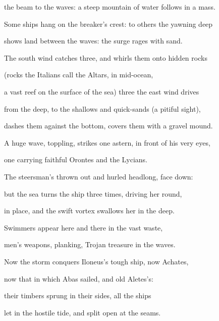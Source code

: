 \documentclass[12pt, a5paper, titlepage]{letter}
\begin{document}
the beam to the waves: a steep mountain of water follows in a mass.

Some ships hang on the breaker’s crest: to others the yawning deep

shows land between the waves: the surge rages with sand.

The south wind catches three, and whirls them onto hidden rocks

(rocks the Italians call the Altars, in mid-ocean,

a vast reef on the surface of the sea) three the east wind drives

from the deep, to the shallows and quick-sands (a pitiful sight),

dashes them against the bottom, covers them with a gravel mound.

A huge wave, toppling, strikes one astern, in front of his very eyes,

one carrying faithful Orontes and the Lycians.

The steersman’s thrown out and hurled headlong, face down:

but the sea turns the ship three times, driving her round,

in place, and the swift vortex swallows her in the deep.

Swimmers appear here and there in the vast waste,

men’s weapons, planking, Trojan treasure in the waves.

Now the storm conquers Iloneus’s tough ship, now Achates,

now that in which Abas sailed, and old Aletes’s:

their timbers sprung in their sides, all the ships

let in the hostile tide, and split open at the seams.
\end{document}
